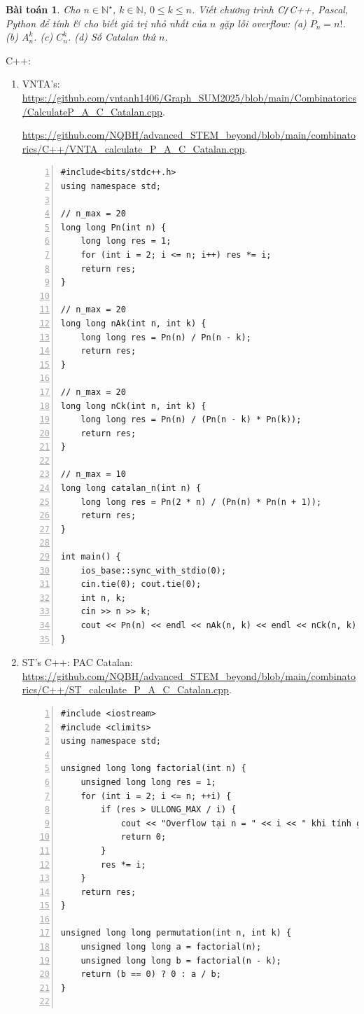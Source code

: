\documentclass[oneside]{book}
\newtheorem{baitoan}{Bài toán}
\begin{document}
\begin{baitoan}
	Cho $n\in\mathbb{N}^\star$, $k\in\mathbb{N}$, $0\le k\le n$. Viết chương trình {\sf C{\tt/}C++, Pascal, Python} để tính \& cho biết giá trị nhỏ nhất của $n$ gặp lỗi overflow: (a) $P_n = n!$. (b) $A_n^k$. (c) $C_n^k$. (d) Số Catalan thứ $n$.	
\end{baitoan}
C++:
\begin{enumerate}
	\item VNTA's: \url{https://github.com/vntanh1406/Graph_SUM2025/blob/main/Combinatorics/CalculateP_A_C_Catalan.cpp}.
	
	\url{https://github.com/NQBH/advanced_STEM_beyond/blob/main/combinatorics/C++/VNTA_calculate_P_A_C_Catalan.cpp}.
	\begin{Verbatim}[numbers=left,xleftmargin=5mm]
#include<bits/stdc++.h>
using namespace std;

// n_max = 20
long long Pn(int n) {
    long long res = 1;
    for (int i = 2; i <= n; i++) res *= i;
    return res;
}

// n_max = 20
long long nAk(int n, int k) {
    long long res = Pn(n) / Pn(n - k);
    return res;
}

// n_max = 20
long long nCk(int n, int k) {
    long long res = Pn(n) / (Pn(n - k) * Pn(k));
    return res;
}

// n_max = 10
long long catalan_n(int n) {
    long long res = Pn(2 * n) / (Pn(n) * Pn(n + 1));
    return res;
}

int main() {
    ios_base::sync_with_stdio(0);
    cin.tie(0); cout.tie(0);
    int n, k;
    cin >> n >> k;
    cout << Pn(n) << endl << nAk(n, k) << endl << nCk(n, k) << endl << catalan_n(n);
}
	\end{Verbatim}
	\item ST's C++: PAC Catalan: \url{https://github.com/NQBH/advanced_STEM_beyond/blob/main/combinatorics/C++/ST_calculate_P_A_C_Catalan.cpp}.
	\begin{Verbatim}[numbers=left,xleftmargin=5mm]
#include <iostream>
#include <climits>
using namespace std;

unsigned long long factorial(int n) {
    unsigned long long res = 1;
    for (int i = 2; i <= n; ++i) {
        if (res > ULLONG_MAX / i) {
            cout << "Overflow tại n = " << i << " khi tính giai thừa.\n";
            return 0;
        }
        res *= i;
    }
    return res;
}

unsigned long long permutation(int n, int k) {
    unsigned long long a = factorial(n);
    unsigned long long b = factorial(n - k);
    return (b == 0) ? 0 : a / b;
}


\end{Verbatim}
\end{enumerate}
\end{document}
